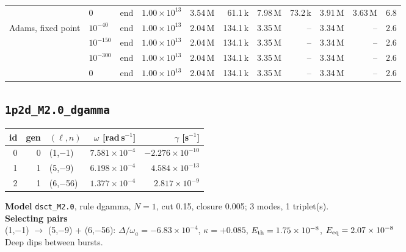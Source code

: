 {\begin{tabular}{@{}llllrrrrrrr@{}}
 & $0$ & end & $1.00\times10^{13}$ & 3.54\,M & 61.1\,k & 7.98\,M & 73.2\,k & 3.91\,M & 3.63\,M & 6.8 \\
\addlinespace[2pt]
Adams, fixed point & $10^{-40}$ & end & $1.00\times10^{13}$ & 2.04\,M & 134.1\,k & 3.35\,M & -- & 3.34\,M & -- & 2.6 \\
 & $10^{-150}$ & end & $1.00\times10^{13}$ & 2.04\,M & 134.1\,k & 3.35\,M & -- & 3.34\,M & -- & 2.6 \\
 & $10^{-300}$ & end & $1.00\times10^{13}$ & 2.04\,M & 134.1\,k & 3.35\,M & -- & 3.34\,M & -- & 2.6 \\
 & $0$ & end & $1.00\times10^{13}$ & 2.04\,M & 134.1\,k & 3.35\,M & -- & 3.34\,M & -- & 2.6 \\
\bottomrule
\end{tabular}}

\clearpage
\subsection{\texttt{1p2d\_M2.0\_dgamma}}\label{net:1p2d_M2.0_dgamma}
\noindent\begin{minipage}[t]{0.43\textwidth}\vspace{0pt}\footnotesize
\begin{tabular}{@{}rrlrr@{}}
\toprule
id & gen & $(\ell,n)$ & $\omega$ [rad\,s$^{-1}$] & $\gamma$ [s$^{-1}$] \\
\midrule
0 & 0 & (1,$-$1) & $7.581\times10^{-4}$ & $-2.276\times10^{-10}$ \\
1 & 1 & (5,$-$9) & $6.198\times10^{-4}$ & $4.584\times10^{-13}$ \\
2 & 1 & (6,$-$56) & $1.377\times10^{-4}$ & $2.817\times10^{-9}$ \\
\bottomrule
\end{tabular}
\end{minipage}\hfill
\begin{minipage}[t]{0.55\textwidth}\vspace{0pt}\footnotesize
\textbf{Model} \texttt{dsct\_M2.0}, rule dgamma, $N=1$, cut 0.15,
closure 0.005; 3 modes, 1 triplet(s).\\[2pt]
\textbf{Selecting pairs}\\ (1,$-$1) $\to$ (5,$-$9) + (6,$-$56): $\Delta/\omega_a=-6.83\times10^{-4}$, $\kappa=+0.085$, $E_{\rm th}=1.75\times10^{-8}$, $E_{\rm eq}=2.07\times10^{-8}$\\[2pt]
Deep dips between bursts.
\end{minipage}

